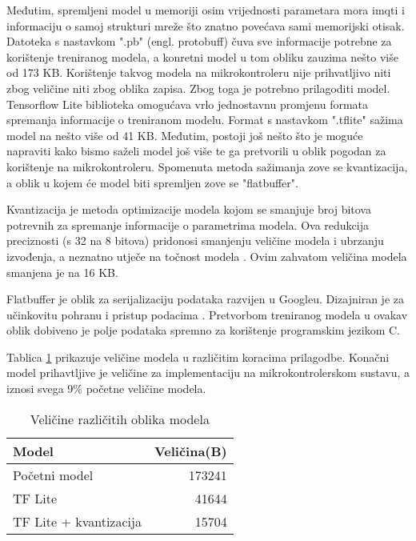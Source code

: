 Međutim, spremljeni model u memoriji osim vrijednosti parametara mora imqti i informaciju 
o samoj strukturi mreže što znatno povećava sami memorijski otisak. Datoteka s nastavkom
".pb" (engl. protobuff) čuva sve informacije potrebne za korištenje treniranog modela,
a konretni model u tom obliku zauzima nešto više od 173 KB. Korištenje takvog modela
na mikrokontroleru nije prihvatljivo niti zbog veličine niti zbog oblika zapisa. Zbog 
toga je potrebno prilagoditi model. Tensorflow Lite biblioteka omogućava vrlo jednostavnu
promjenu formata spremanja informacije o treniranom modelu. Format s nastavkom ".tflite"
sažima model na nešto više od 41 KB. Međutim, postoji još nešto što je moguće napraviti
kako bismo saželi model još više te ga pretvorili u oblik pogodan za korištenje na
mikrokontroleru. Spomenuta metoda sažimanja zove se kvantizacija, a oblik u kojem će model
biti spremljen zove se "flatbuffer".

Kvantizacija je metoda optimizacije modela kojom se smanjuje broj bitova potrevnih za
spremanje informacije o parametrima modela. Ova redukcija preciznosti (s 32 na 8 bitova)
pridonosi smanjenju veličine modela i ubrzanju izvođenja, a neznatno utječe na točnost
modela \cite{}. Ovim zahvatom veličina modela smanjena je na 16 KB. 

Flatbuffer je oblik za serijalizaciju podataka razvijen u Googleu. Dizajniran je
za učinkovitu pohranu i pristup podacima \cite{}. 
Pretvorbom treniranog modela u ovakav oblik
dobiveno je polje podataka spremno za korištenje programskim jezikom C.

Tablica \ref{tab:model_sizes} prikazuje veličine modela u različitim koracima prilagodbe.
Konačni model prihavtljive je veličine za implementaciju na mikrokontrolerskom sustavu, 
a iznosi svega 9\% početne veličine modela.

\begin{table}[htb]
    \centering
    \begin{tabular}{|l|r|}
        \hline
        \textbf{Model} & \textbf{Veličina(B)} \\ \hline
        Početni model & 173241\\ \hline
        TF Lite & 41644 \\ \hline
        TF Lite + kvantizacija & 15704 \\ \hline
    \end{tabular}
    \caption{Veličine različitih oblika modela}
    \label{tab:model_sizes}
\end{table}